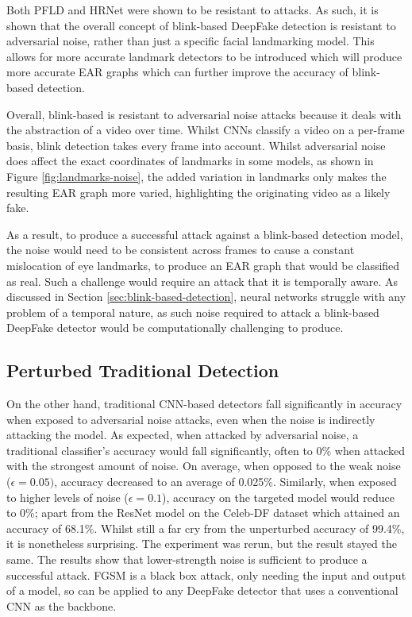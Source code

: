Both PFLD and HRNet were shown to be resistant to attacks. As such, it is shown that the overall concept of blink-based DeepFake detection is resistant to adversarial noise, rather than just a specific facial landmarking model. This allows for more accurate landmark detectors to be introduced which will produce more accurate EAR graphs which can further improve the accuracy of blink-based detection. 

Overall, blink-based is resistant to adversarial noise attacks because it deals with the abstraction of a video over time. Whilst CNNs classify a video on a per-frame basis, blink detection takes every frame into account. Whilst adversarial noise does affect the exact coordinates of landmarks in some models, as shown in Figure \ref{fig:landmarks-noise}, the added variation in landmarks only makes the resulting EAR graph more varied, highlighting the originating video as a likely fake.

As a result, to produce a successful attack against a blink-based detection model, the noise would need to be consistent across frames to cause a constant mislocation of eye landmarks, to produce an EAR graph that would be classified as real. Such a challenge would require an attack that it is temporally aware. As discussed in Section \ref{sec:blink-based-detection}, neural networks struggle with any problem of a temporal nature, as such noise required to attack a blink-based DeepFake detector would be computationally challenging to produce.

\subsection{Perturbed Traditional Detection}

On the other hand, traditional CNN-based detectors fall significantly in accuracy when exposed to adversarial noise attacks, even when the noise is indirectly attacking the model. As expected, when attacked by adversarial noise, a traditional classifier's accuracy would fall significantly, often to 0\% when attacked with the strongest amount of noise. On average, when opposed to the weak noise ($\epsilon=0.05)$, accuracy decreased to an average of 0.025\%. Similarly, when exposed to higher levels of noise ($\epsilon=0.1$), accuracy on the targeted model would reduce to 0\%; apart from the ResNet model on the Celeb-DF dataset which attained an accuracy of 68.1\%. Whilst still a far cry from the unperturbed accuracy of 99.4\%, it is nonetheless surprising. The experiment was rerun, but the result stayed the same. The results show that lower-strength noise is sufficient to produce a successful attack. FGSM is a black box attack, only needing the input and output of a model, so can be applied to any DeepFake detector that uses a conventional CNN as the backbone.

